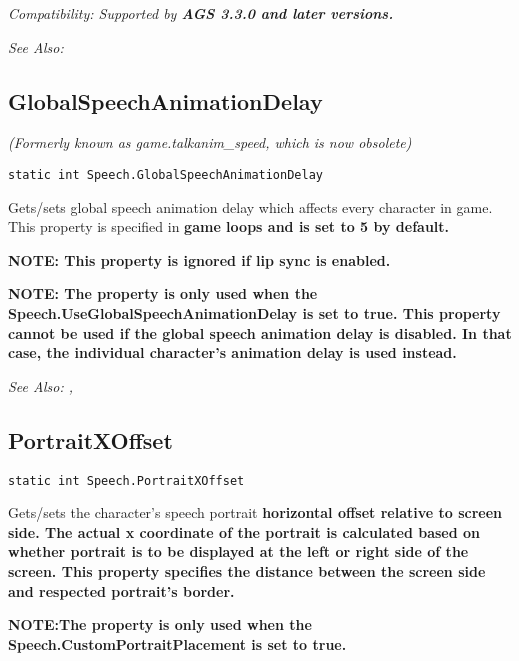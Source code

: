 \it{Compatibility:} Supported by \bf{AGS 3.3.0} and later versions.

\it{See Also:} 


\subsection{GlobalSpeechAnimationDelay}\label{Speech.GlobalSpeechAnimationDelay}%

\it{(Formerly known as game.talkanim_speed, which is now obsolete)}

\begin{verbatim}
static int Speech.GlobalSpeechAnimationDelay
\end{verbatim}

Gets/sets global speech animation delay which affects every character in game.
This property is specified in \bf{game loops} and is set to 5 by default.

\bf{NOTE:} This property is ignored if lip sync is enabled.

\bf{NOTE:} The property is only used when the \bf{Speech.UseGlobalSpeechAnimationDelay} is set to \bf{true}. This property \bf{cannot} be used if the global speech animation delay is disabled. In that case, the individual character's animation delay is used instead.

\it{See Also:} ,


\subsection{PortraitXOffset}\label{Speech.PortraitXOffset}%

\begin{verbatim}
static int Speech.PortraitXOffset
\end{verbatim}

Gets/sets the character's speech portrait \bf{horizontal} offset relative to screen side.
The actual x coordinate of the portrait is calculated based on whether portrait is to be displayed at the left or right side of the screen. This property specifies the distance between the screen side and respected portrait's border.

\bf{NOTE:}The property is only used when the \bf{Speech.CustomPortraitPlacement} is set to \bf{true}.

